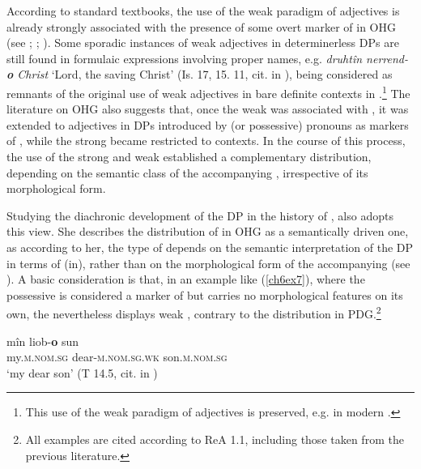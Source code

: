 \documentclass[output=paper,colorlinks,citecolor=brown]{langscibook}
\begin{document}
According to standard textbooks, the use of the weak paradigm of
adjectives is already strongly associated with the presence of some
overt marker of  in OHG (see \citealp[183--184]{behaghel1923deutsche}; \citealp[68]{Dal14}; \citealp[297, 309]{Braune2018AHD}). Some sporadic instances of weak
adjectives in determinerless DPs are still found in formulaic
expressions involving proper names, e.g. \emph{druhtîn nerrend-\textbf{o} Christ} `Lord, the
saving Christ' (Is. 17, 15. 11, cit. in \citealp[748]{Wilmanns09}), being
considered as remnants of the original use of weak adjectives in bare
definite contexts in .\footnote{This use of the weak paradigm of
  adjectives is preserved, e.g. in modern  \citep{HaberlandHeltoft2008}.} The literature on OHG also suggests that, once the weak
 was associated with , it was extended to
adjectives in DPs introduced by  (or possessive) pronouns
as markers of , while the strong  became restricted
to  contexts. In the course of this process, the use of the
strong and weak  established a complementary distribution,
depending on the semantic class of the accompanying , irrespective of its morphological form.

Studying the diachronic development of the DP in the history of ,
\citet{Demske01} also adopts this view. She describes the distribution of
 in OHG as a semantically driven one, as according
to her, the type of  depends on the semantic interpretation of
the DP in terms of (in), rather than on the morphological
form of the accompanying  (see \citealp[68]{Demske01}). A basic
consideration is that, in an example like (\ref{ch6ex7}), where the possessive
 is considered a marker of  but carries no
morphological features on its own, the  nevertheless displays
weak , contrary to the distribution in PDG.\footnote{All examples are cited according to ReA 1.1, including those taken from the previous literature.}

\begin{exe}
\ex\label{ch6ex7}
\gll mîn liob-\textbf{o} sun\\
my.\textsc{m.nom.sg} dear-\textsc{m.nom.sg.wk} son.\textsc{m.nom.sg}\\
\glt `my dear son' (T 14.5, cit. in \cite[67, ex. (39a)]{Demske01}) 
\end{exe}
\end{document}
